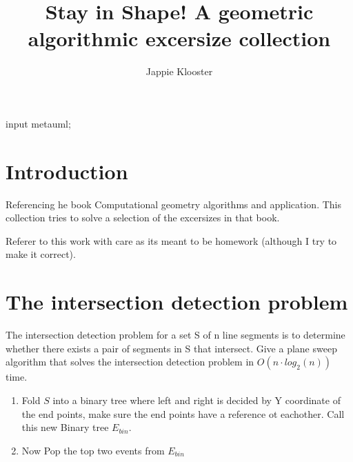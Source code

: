 \documentclass{article}
\begin{document}
\begin{empfile}
\begin{empcmds}
input metauml;
\end{empcmds}
\author{Jappie Klooster}
\title{Stay in Shape! A geometric algorithmic excersize collection}
\maketitle

\section{Introduction}
Referencing he book Computational geometry algorithms and application.
This collection  tries to solve a selection of the excersizes in that book.

Referer to this work with care as its meant to be homework (although
I try to make it correct).

\section{The intersection detection problem}
The intersection detection problem for a set S of n line segments is to
determine whether there exists a pair of segments in S that intersect. Give
a plane sweep algorithm that solves the intersection detection problem in
$O(n \cdot  log_2(n))$ time.

\begin{enumerate}
	\item Fold $S$ into a binary tree where left and right is decided by Y
	coordinate of the end points,
	make sure the end points have a reference ot eachother.
	Call this new Binary tree $E_{bin}$.
\item Now Pop the top two events from $E_{bin}$
\end{enumerate}

\end{empfile}
\end{document}
